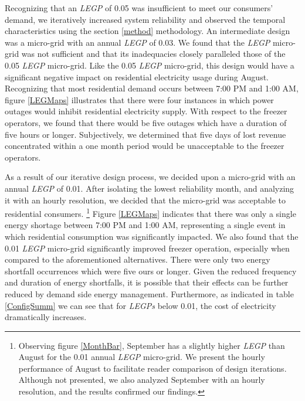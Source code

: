 \documentclass[11p]{article}
\begin{document}

Recognizing that an \emph{LEGP} of 0.05 was insufficient to meet our consumers' demand, we iteratively increased system reliability and observed the temporal characteristics using the section \ref{method} methodology.
An intermediate design was a micro-grid with an annual \emph{LEGP} of 0.03. 
We found that the \emph{LEGP} micro-grid was not sufficient and that its inadequacies closely paralleled those of the 0.05 \emph{LEGP} micro-grid.
Like the 0.05 \emph{LEGP} micro-grid, this design would have a significant negative impact on residential electricity usage during August.
Recognizing that most residential demand occurs between 7:00 PM and 1:00 AM, figure \ref{LEGMaps} illustrates that there were four instances in which power outages would inhibit residential electricity supply. 
With respect to the freezer operators, we found that there would be five outages which have a duration of five hours or longer. 
Subjectively, we determined that five days of lost revenue concentrated within a one month period would be unacceptable to the freezer operators. 

As a result of our iterative design process, we decided upon a micro-grid with an annual \emph{LEGP} of 0.01. After isolating the lowest reliability month, and analyzing it with an hourly resolution, we decided that the micro-grid was acceptable to residential consumers. 
%
%
\footnote{Observing figure \ref{MonthBar}, September has a slightly higher \emph{LEGP} than August for the 0.01 annual \emph{LEGP} micro-grid. 
We present the hourly performance of August to facilitate reader comparison of design iterations. 
Although not presented, we also analyzed September with an hourly resolution, and the results confirmed our findings.}
%
%
%
Figure \ref{LEGMaps} indicates that there was only a single energy shortage between 7:00 PM and 1:00 AM, representing a single event in which residential consumption was significantly impacted.
We also found that the 0.01 \emph{LEGP} micro-grid significantly improved freezer operation, especially when compared to the aforementioned alternatives. There were only two energy shortfall occurrences which were five ours or longer. 
Given the reduced frequency and duration of energy shortfalls, it is possible that their effects can be further reduced by demand side energy management.
Furthermore, as indicated in table \ref{ConfigSumm} we can see that for \emph{LEGPs} below 0.01, the cost of electricity dramatically increases.
\end{document}
